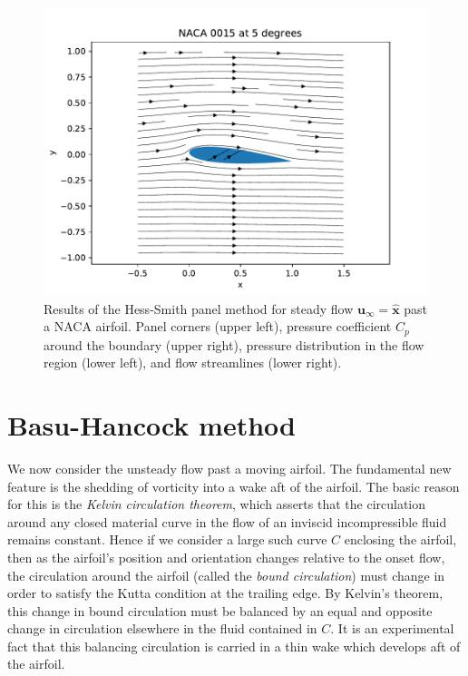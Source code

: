 \documentclass[10pt]{article}
\newcommand\defn[1]{\emph{#1}}
\begin{document}
\begin{figure}[htbp]
\begin{center}
\includegraphics[scale=.4]{plots/naca_streamlines.pdf}
\caption{Results of the Hess-Smith panel method for steady flow $\mathbf u_\infty=\hat{\mathbf x}$ past a NACA airfoil.  Panel corners (upper left), pressure coefficient $C_p$ around the boundary (upper right), pressure distribution in the flow region (lower left), and flow streamlines (lower right).}\label{fig:naca_ubem2d}
\end{center}
\end{figure}

\section{Basu-Hancock method}
We now consider the unsteady flow past a moving airfoil.  The fundamental new feature is the shedding of vorticity into a wake aft of the airfoil.  The basic reason for this is the \defn{Kelvin circulation theorem}, which asserts that the circulation around any closed material curve in the flow of an inviscid incompressible fluid remains constant.  Hence if we consider a large such curve $C$ enclosing the airfoil, then as the airfoil's position and orientation changes relative to the onset flow, the circulation around the airfoil (called the \defn{bound circulation}) must change in order to satisfy the Kutta condition at the trailing edge.  By Kelvin's theorem, this change in bound circulation must be balanced by an equal and opposite change in circulation elsewhere in the fluid contained in $C$.  It is an experimental fact that this balancing circulation is carried in a thin wake which develops aft of the airfoil.
\end{document}
